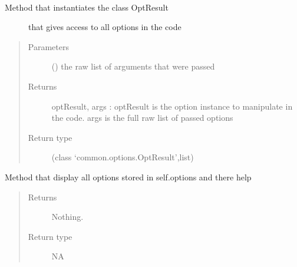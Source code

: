 \documentclass[a4paper,10pt,english]{sphinxmanual}
\begin{document}
\begin{fulllineitems}
\begin{fulllineitems}
\begin{quote}
\begin{description}
\end{description}\end{quote}

\end{fulllineitems}


\begin{fulllineitems}
\label{\detokenize{commands/apidoc/src:src.options.Options.parse_args}}~\begin{description}
\item[{Method that instantiates the class OptResult }] \leavevmode
that gives access to all options in the code

\end{description}
\begin{quote}\begin{description}
\item[{Parameters}] \leavevmode
{} () \textendash{} the raw list of arguments that were passed

\item[{Returns}] \leavevmode
optResult, args : optResult is the option instance 
to manipulate in the code. args 
is the full raw list of passed options

\item[{Return type}] \leavevmode
(class ‘common.options.OptResult’,list)

\end{description}\end{quote}

\end{fulllineitems}


\begin{fulllineitems}
\label{\detokenize{commands/apidoc/src:src.options.Options.print_help}}
Method that display all options stored in self.options and there help
\begin{quote}\begin{description}
\item[{Returns}] \leavevmode
Nothing.

\item[{Return type}] \leavevmode
NA

\end{description}\end{quote}

\end{fulllineitems}


\end{fulllineitems}
\end{document}
